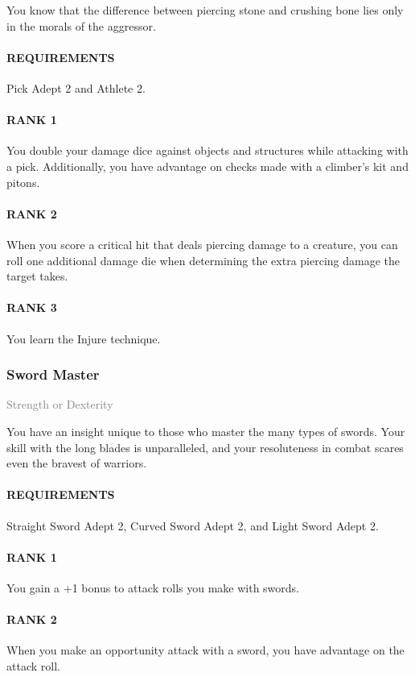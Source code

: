 \normalsize
You know that the difference between piercing stone and crushing bone lies only in the morals of the aggressor.
\paragraph{REQUIREMENTS} Pick Adept 2 and Athlete 2.
\paragraph{RANK 1} You double your damage dice against objects and structures while attacking with a pick.
Additionally, you have advantage on checks made with a climber's kit and pitons.
\paragraph{RANK 2} When you score a critical hit that deals piercing damage to a creature, you can roll one additional damage die when determining the extra piercing damage the target takes.
\paragraph{RANK 3} You learn the Injure technique.

\subsubsection{Sword Master} \label{feat::swordmaster}
\small{\textcolor{gray}{Strength or Dexterity}}

\normalsize
You have an insight unique to those who master the many types of swords.
Your skill with the long blades is unparalleled, and your resoluteness in combat scares even the bravest of warriors.
\paragraph{REQUIREMENTS} Straight Sword Adept 2, Curved Sword Adept 2, and Light Sword Adept 2.
\paragraph{RANK 1} You gain a +1 bonus to attack rolls you make with swords.
\paragraph{RANK 2} When you make an opportunity attack with a sword, you have advantage on the attack roll.

